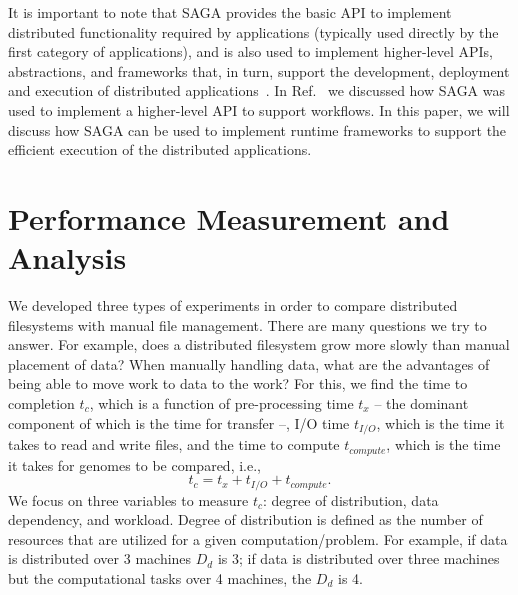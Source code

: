 \documentclass{rspublic}
\begin{document}

It is important to note that SAGA provides the basic API to implement
distributed functionality required by applications (typically used
directly by the first category of applications), and is also used to
implement higher-level APIs, abstractions, and frameworks that, in
turn, support the development, deployment and execution of distributed
applications~\cite{saga_gmac09}. In Ref.~\cite{saga_montage_escience09} we
discussed how SAGA was used to implement a higher-level API to support
workflows. In this paper, we will discuss how SAGA can be used to
implement runtime frameworks to support the efficient execution of the
distributed applications.


\section{Performance Measurement and Analysis} We developed three types
of experiments in order to compare distributed filesystems with manual
file management. There are many questions we try to answer.  For example, does a
distributed filesystem grow more slowly than manual placement of data?
When manually handling data, what are the advantages of being able to
move work to data to the work? For this, we find the time to completion
$t_c$, which is a function of pre-processing time $t_x$ -- the dominant
component of which is the time for transfer --, I/O time
$t_{I/O}$, which is the time it takes to read and write files, and the
time to compute $t_{compute}$, which is the time it takes for genomes to
be compared, i.e.,
 \begin{equation}
t_c = t_x + t_{I/O} + t_{compute}.
\end{equation}
We focus on three variables to measure $t_c$: degree of distribution,
data dependency, and workload. Degree of distribution is defined as
the number of resources that are utilized for a given
computation/problem. For example, if data is distributed over 3
machines $D_d$ is 3; if data is distributed over three machines but
the computational tasks over 4 machines, the $D_d$ is 4.
\end{document}
